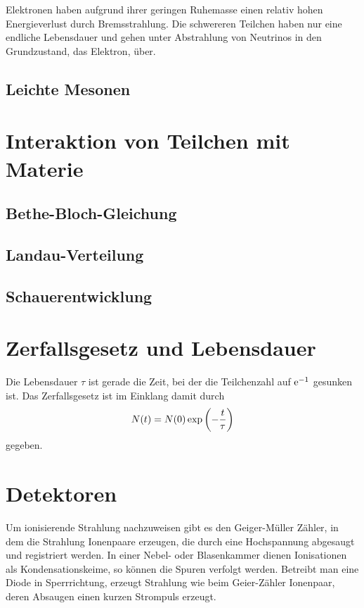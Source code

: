 \documentclass[11pt, ngerman, fleqn, DIV=15, headinclude, BCOR=2cm]{scrreprt}
\begin{document}
Elektronen haben aufgrund ihrer geringen Ruhemasse einen relativ hohen
Energieverlust durch Bremsstrahlung. Die schwereren Teilchen haben nur eine
endliche Lebensdauer und gehen unter Abstrahlung von Neutrinos in den
Grundzustand, das Elektron, über.

\subsection{Leichte Mesonen}


\section{Interaktion von Teilchen mit Materie}

\subsection{Bethe-Bloch-Gleichung}


\subsection{Landau-Verteilung}


\subsection{Schauerentwicklung}


\section{Zerfallsgesetz und Lebensdauer}

Die Lebensdauer $\tau$ ist gerade die Zeit, bei der die Teilchenzahl auf
$\mathrm e^{-1}$ gesunken ist. Das Zerfallsgesetz ist im Einklang damit durch
\[
    N(t) = N(0) \exp\del{- \frac t\tau}
\]
gegeben.

\section{Detektoren}

Um ionisierende Strahlung nachzuweisen gibt es den Geiger-Müller Zähler, in dem
die Strahlung Ionenpaare erzeugen, die durch eine Hochspannung abgesaugt und
registriert werden. In einer Nebel- oder Blasenkammer dienen Ionisationen als
Kondensationskeime, so können die Spuren verfolgt werden. Betreibt man eine
Diode in Sperrrichtung, erzeugt Strahlung wie beim Geier-Zähler Ionenpaar,
deren Absaugen einen kurzen Strompuls erzeugt.
\end{document}
